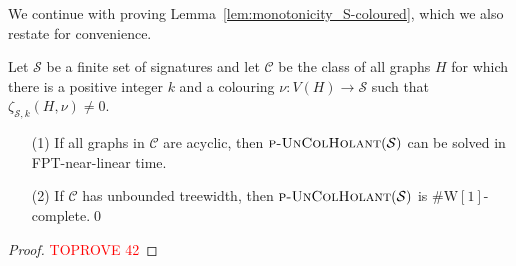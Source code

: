 \documentclass[authorcolumns,numberwithinsect]{no-lipics-v2022}
\newcommand{\W}{\mathrm{W}}
\begin{document}
We continue with proving Lemma~\ref{lem:monotonicity_S-coloured}, which we also restate for convenience.

\begin{lemma}
    Let $\mathcal{S}$ be a finite set of signatures and let $\mathcal{C}$ be the class of all graphs $H$ for which there is a positive integer $k$ and a colouring $\nu:V(H)\to \mathcal{S}$ such that $\zeta_{\mathcal{S},k}(H,\nu)\neq 0$.
    \begin{itemize}
        \item[(1)] If all graphs in $\mathcal{C}$ are acyclic, then  $\text{\sc{p-UnColHolant}}(\mathcal{S})$ can be solved in FPT-near-linear time.
        \item[(2)] If $\mathcal{C}$ has unbounded treewidth, then $\text{\sc{p-UnColHolant}}(\mathcal{S})$ is $\#\W[1]$-complete.\qed
    \end{itemize}
\end{lemma}
\begin{proof}\textcolor{red}{TOPROVE 42}\end{proof}
\end{document}
